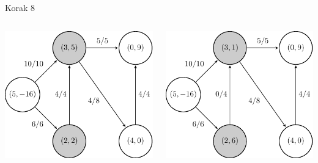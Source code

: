 \documentclass{beamer}
\begin{document}
\begin{frame}{Korak 8}
    \begin{columns}
        \begin{column}{0.5\textwidth}
            \centering
            \includegraphics[scale=0.7]{../writing/images/graf2-9.pdf}
        \end{column}
        \pause
        \begin{column}{0.5\textwidth}
            \centering
            \includegraphics[scale=0.7]{../writing/images/graf2-10.pdf}
        \end{column}
    \end{columns}
\end{frame}
\end{document}
